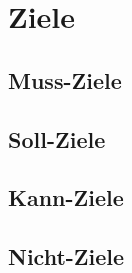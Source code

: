 \chapter{Ziele}
\section{Muss-Ziele}
\section{Soll-Ziele}
\section{Kann-Ziele}
\section{Nicht-Ziele}
